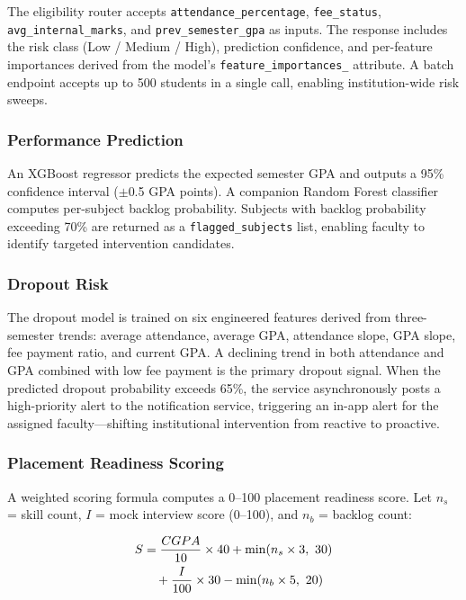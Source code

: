 \documentclass[conference]{IEEEtran}
\begin{document}
The eligibility router accepts \texttt{attendance\_percentage},
\texttt{fee\_status}, \texttt{avg\_internal\_marks}, and
\texttt{prev\_semester\_gpa} as inputs. The response includes the risk class
(Low / Medium / High), prediction confidence, and per-feature importances
derived from the model's \texttt{feature\_importances\_} attribute. A batch
endpoint accepts up to 500 students in a single call, enabling institution-wide
risk sweeps.

\subsubsection{Performance Prediction}

An XGBoost regressor predicts the expected semester GPA and outputs a 95\%
confidence interval ($\pm$0.5 GPA points). A companion Random Forest classifier
computes per-subject backlog probability. Subjects with backlog probability
exceeding 70\% are returned as a \texttt{flagged\_subjects} list, enabling
faculty to identify targeted intervention candidates.

\subsubsection{Dropout Risk}

The dropout model is trained on six engineered features derived from
three-semester trends: average attendance, average GPA, attendance slope, GPA
slope, fee payment ratio, and current GPA. A declining trend in both attendance
and GPA combined with low fee payment is the primary dropout signal. When the
predicted dropout probability exceeds 65\%, the service asynchronously posts a
high-priority alert to the notification service, triggering an in-app alert for
the assigned faculty---shifting institutional intervention from reactive to
proactive.

\subsubsection{Placement Readiness Scoring}

A weighted scoring formula computes a 0--100 placement readiness
score. Let $n_s$ = skill count, $I$ = mock interview score (0--100),
and $n_b$ = backlog count:

\begin{align}
S &= \frac{CGPA}{10} \times 40 + \min(n_{s} \times 3,\ 30) \notag \\
  &\quad + \frac{I}{100} \times 30 - \min(n_{b} \times 5,\ 20)
\label{eq:placement}
\end{align}
\end{document}
